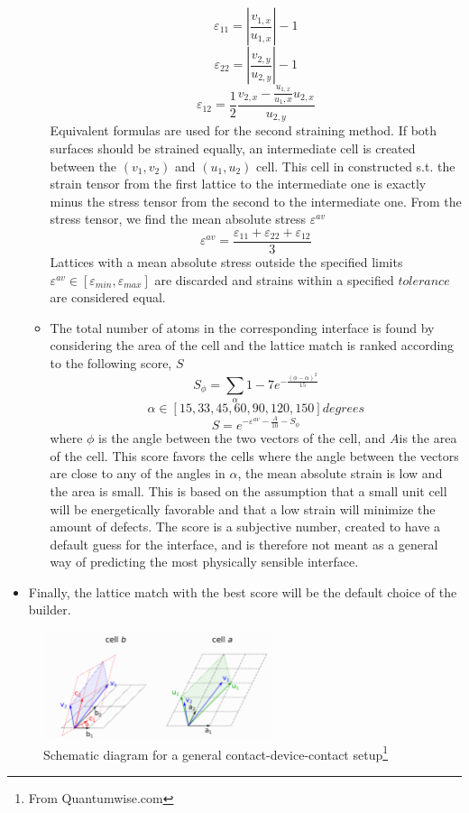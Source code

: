 \begin{itemize}
\begin{itemize}
$$
\varepsilon_{11}=|\frac{v_{1,x}}{u_{1,x}}|-1
$$
$$
\varepsilon_{22}=|\frac{v_{2,y}}{u_{2,y}}|-1
$$
$$
\varepsilon_{12}=\frac{1}{2}\frac{v_{2,x}-\frac{u_{1,x}}{u_1,x}u_{2,x}}{u_{2,y}}
$$
Equivalent formulas are used for the second straining method. If both surfaces should be strained equally, an intermediate cell is created between the $(v_1,v_2)$ and $(u_1,u_2)$ cell. This cell in constructed s.t. the strain tensor from the first lattice to the intermediate one is exactly minus the stress tensor from the second to the intermediate one. From the stress tensor, we find the mean absolute stress $\varepsilon^{av}$
$$
\varepsilon^{av}=\frac{\varepsilon_{11}+\varepsilon_{22}+\varepsilon_{12}}{3}
$$
Lattices with a mean absolute stress outside the specified limits $\varepsilon^{av} \in [\varepsilon_{min},\varepsilon_{max}]$ are discarded and strains within a specified \textbf{$tolerance$} are considered equal.
\item The total number of atoms in the corresponding interface is found by considering the area of the cell and the lattice match is ranked according to the following score, $S$
$$
S_{\phi} = \sum_{\alpha} 1- 7 e^{-\frac{(\phi - \alpha)^2}{15}}
$$
$$
\alpha \in [15,33,45,60,90,120,150] degrees
$$
$$
S = e^{-\varepsilon^{av} - \frac{A}{10}- S_{\phi}}
$$
where $\phi$ is the angle between the two vectors of the cell, and 
 $A$is the area of the cell. This score favors the cells where the angle between the vectors are close to any of the angles in $\alpha$, the mean absolute strain is low and the area is small. This is based on the assumption that a small unit cell will be energetically favorable and that a low strain will minimize the amount of defects. The score is a subjective number, created to have a default guess for the interface, and is therefore not meant as a general way of predicting the most physically sensible interface.
\end{itemize}
\item Finally, the lattice match with the best score will be the default choice of the builder.
\end{itemize}



\begin{figure}[htbp!] 
\centering    
\includegraphics[width=0.6\textwidth]{cell}
\caption[Cell]{Schematic diagram for a general contact-device-contact setup\footnote{From Quantumwise.com}}
\label{fig:cell}
\end{figure}

